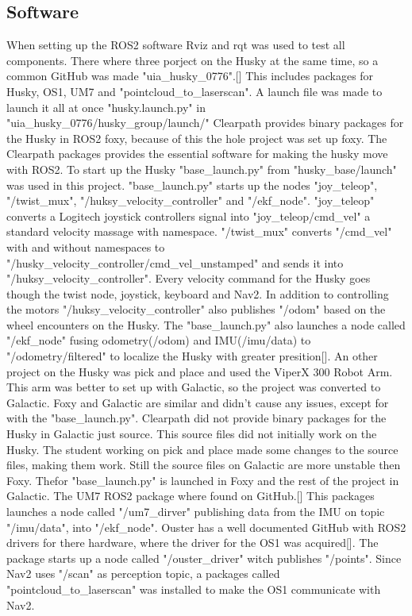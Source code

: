\subsection{Software}
When setting up the ROS2 software Rviz and rqt was used to test all components. 
There where three porject on the Husky at the same time, so a common GitHub was made "uia\_husky\_0776".[] This includes packages for Husky, OS1, UM7 and "pointcloud\_to\_laserscan". A launch file was made to launch it all at once "husky.launch.py" in "uia\_husky\_0776/husky\_group/launch/"
Clearpath provides binary packages for the Husky in ROS2 foxy, because of this the hole project was set up foxy. The Clearpath packages provides the essential software for making the husky move with ROS2. To start up the Husky "base\_launch.py" from "husky\_base/launch" was used in this project. "base\_launch.py" starts up the nodes "joy\_teleop", "/twist\_mux", "/huksy\_velocity\_controller" and "/ekf\_node". 
"joy\_teleop" converts a Logitech joystick controllers signal into "joy\_teleop/cmd\_vel" a standard velocity massage with namespace. 
"/twist\_mux" converts "/cmd\_vel" with and without namespaces to "/husky\_velocity\_controller/cmd\_vel\_unstamped" and sends it into "/huksy\_velocity\_controller". Every velocity command for the Husky goes though the twist node, joystick, keyboard and Nav2. In addition to controlling the motors "/huksy\_velocity\_controller" also publishes "/odom" based on the wheel encounters on the Husky. The "base\_launch.py" also launches a node called "/ekf\_node" fusing odometry(/odom) and IMU(/imu/data) to "/odometry/filtered" to localize the Husky with greater presition[]. 
An other project on the Husky was pick and place and used the ViperX 300 Robot Arm. This arm was better to set up with Galactic, so the project was converted to Galactic. Foxy and Galactic are similar and didn't cause any issues, except for with the "base\_launch.py". Clearpath did not provide binary packages for the Husky in Galactic just source. This source files did not initially work on the Husky. The student working on pick and place made some changes to the source files, making them work. Still the source files on Galactic are more unstable then Foxy. Thefor "base\_launch.py" is launched in Foxy and the rest of the project in Galactic. 
The UM7 ROS2 package where found on GitHub.[] This packages launches a node called "/um7\_dirver" publishing data from the IMU on topic "/imu/data", into "/ekf\_node".
Ouster has a well documented GitHub with ROS2 drivers for there hardware, where the driver for the OS1 was acquired[]. The package starts up a node called "/ouster\_driver" witch publishes "/points". Since Nav2 uses "/scan" as perception topic, a packages called "pointcloud\_to\_laserscan" was installed to make the OS1 communicate with Nav2. 

